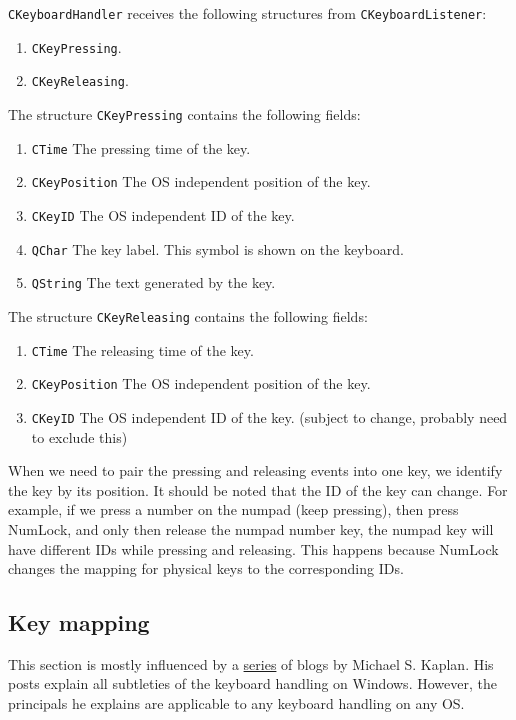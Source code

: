 \documentclass{article}
\begin{document}
\verb"CKeyboardHandler" receives the following structures from \verb"CKeyboardListener":
\begin{enumerate}
\item \verb"CKeyPressing".
\item \verb"CKeyReleasing".
\end{enumerate}

The structure \verb"CKeyPressing" contains the following fields:
\begin{enumerate}
\item \verb"CTime" The pressing time of the key.
\item \verb"CKeyPosition" The OS independent position of the key.
\item \verb"CKeyID" The OS independent ID of the key.
\item \verb"QChar" The key label. This symbol is shown on the keyboard.
\item \verb"QString" The text generated by the key.
\end{enumerate}

The structure \verb"CKeyReleasing" contains the following fields:
\begin{enumerate}
\item \verb"CTime" The releasing time of the key.
\item \verb"CKeyPosition" The OS independent position of the key.
\item \verb"CKeyID" The OS independent ID of the key. (subject to change, probably need to exclude this)
\end{enumerate}

When we need to pair the pressing and releasing events into one key, we identify the key by its position. It should be noted that the ID of the key can change. For example, if we press a number on the numpad (keep pressing), then press NumLock, and only then release the numpad number key, the numpad key will have different IDs while pressing and releasing. This happens because NumLock changes the mapping for physical keys to the corresponding IDs.

\subsection{Key mapping}

This section is mostly influenced by a \href{http://archives.miloush.net/michkap/archive/2006/03/23/558658.html}{series} of blogs by Michael S. Kaplan. His posts explain all subtleties of the keyboard handling on Windows. However, the principals he explains are applicable to any keyboard handling on any OS.
\end{document}
